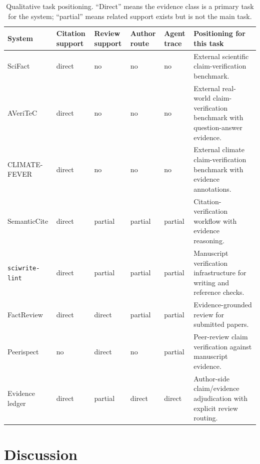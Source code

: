 \documentclass[11pt]{article}
\begin{document}
\begin{table}[H]
\centering
\caption{Qualitative task positioning. ``Direct'' means the evidence class is a primary task for the system; ``partial'' means related support exists but is not the main task.}
\label{tab:close-tools}
\scriptsize
\setlength{\tabcolsep}{3pt}
\begin{tabularx}{\textwidth}{>{\raggedright\arraybackslash}p{}>{\centering\arraybackslash}p{}>{\centering\arraybackslash}p{}>{\centering\arraybackslash}p{}>{\centering\arraybackslash}p{}>{\raggedright\arraybackslash}X}
\toprule
System & Citation support & Review support & Author route & Agent trace & Positioning for this task \\
\midrule
SciFact \citep{Wadden2020Fact} & direct & no & no & no & External scientific claim-verification benchmark. \\
AVeriTeC \citep{Schlichtkrull2023AVeriTeC} & direct & no & no & no & External real-world claim-verification benchmark with question-answer evidence. \\
CLIMATE-FEVER \citep{Diggelmann2020ClimateFever} & direct & no & no & no & External climate claim-verification benchmark with evidence annotations. \\
SemanticCite \citep{Haan2025SemanticCite} & direct & partial & partial & partial & Citation-verification workflow with evidence reasoning. \\
\texttt{sciwrite-lint} \citep{Samsonau2026SciwriteLint} & direct & partial & partial & partial & Manuscript verification infrastructure for writing and reference checks. \\
FactReview \citep{Yue2026FactReview} & direct & direct & partial & partial & Evidence-grounded review for submitted papers. \\
Peerispect \citep{Ghorbanpour2026Peerispect} & no & direct & no & partial & Peer-review claim verification against manuscript evidence. \\
Evidence ledger & direct & partial & direct & direct & Author-side claim/evidence adjudication with explicit review routing. \\
\bottomrule
\end{tabularx}
\end{table}

\section{Discussion}
\end{document}
